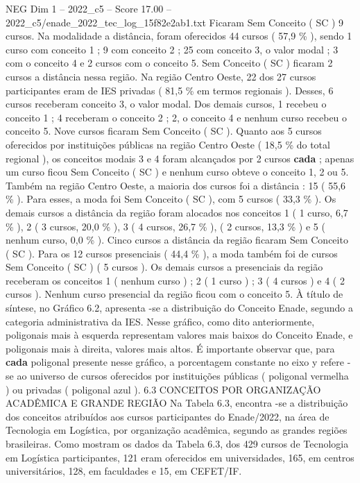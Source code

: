 \begin{textsample}{NEG Dim 1 – 2022\_c5 – Score 17.00 – 2022\_c5/enade\_2022\_tec\_log\_15f82e2ab1.txt}
Ficaram Sem Conceito ( SC ) 9 cursos.
Na modalidade a distância, foram oferecidos 44 cursos ( 57,9 \% ), sendo 1 curso com conceito 1 ; 9 com conceito 2 ; 25 com conceito 3, o valor modal ; 3 com o conceito 4 e 2 cursos com o conceito 5.
Sem Conceito ( SC ) ficaram 2 cursos a distância nessa região.
Na região Centro Oeste, 22 dos 27 cursos participantes eram de IES privadas ( 81,5 \% em termos regionais ).
Desses, 6 cursos receberam conceito 3, o valor modal.
Dos demais cursos, 1 recebeu o conceito 1 ; 4 receberam o conceito 2 ; 2, o conceito 4 e nenhum curso recebeu o conceito 5.
Nove cursos ficaram Sem Conceito ( SC ).
Quanto aos 5 cursos oferecidos por instituições públicas na região Centro Oeste ( 18,5 \% do total regional ), os conceitos modais 3 e 4 foram alcançados por 2 cursos \textbf{cada} ; apenas um curso ficou Sem Conceito ( SC ) e nenhum curso obteve o conceito 1, 2 ou 5.
Também na região Centro Oeste, a maioria dos cursos foi a distância : 15 ( 55,6 \% ).
Para esses, a moda foi Sem Conceito ( SC ), com 5 cursos ( 33,3 \% ).
Os demais cursos a distância da região foram alocados nos conceitos 1 ( 1 curso, 6,7 \% ), 2 ( 3 cursos, 20,0 \% ), 3 ( 4 cursos, 26,7 \% ), ( 2 cursos, 13,3 \% ) e 5 ( nenhum curso, 0,0 \% ).
Cinco cursos a distância da região ficaram Sem Conceito ( SC ).
Para os 12 cursos presenciais ( 44,4 \% ), a moda também foi de cursos Sem Conceito ( SC ) ( 5 cursos ).
Os demais cursos a presenciais da região receberam os conceitos 1 ( nenhum curso ) ; 2 ( 1 curso ) ; 3 ( 4 cursos ) e 4 ( 2 cursos ).
Nenhum curso presencial da região ficou com o conceito 5.
À título de síntese, no Gráfico 6.2, apresenta -se a distribuição do Conceito Enade, segundo a categoria administrativa da IES.
Nesse gráfico, como dito anteriormente, poligonais mais à esquerda representam valores mais baixos do Conceito Enade, e poligonais mais à direita, valores mais altos.
É importante observar que, para \textbf{cada} poligonal presente nesse gráfico, a porcentagem constante no eixo y refere -se ao universo de cursos oferecidos por instituições públicas ( poligonal vermelha ) ou privadas ( poligonal azul ). 6.3 CONCEITOS POR ORGANIZAÇÃO ACADÊMICA E GRANDE REGIÃO Na Tabela 6.3, encontra -se a distribuição dos conceitos atribuídos aos cursos participantes do Enade/2022, na área de Tecnologia em Logística, por organização acadêmica, segundo as grandes regiões brasileiras.
Como mostram os dados da Tabela 6.3, dos 429 cursos de Tecnologia em Logística participantes, 121 eram oferecidos em universidades, 165, em centros universitários, 128, em faculdades e 15, em CEFET/IF.

\end{textsample}
